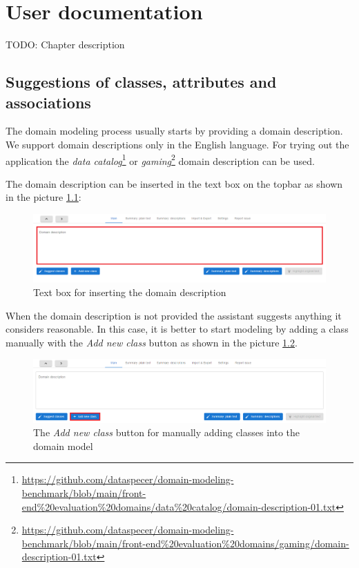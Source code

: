 \chapter{User documentation}

\noindent{}TODO: Chapter description


\section{Suggestions of classes, attributes and associations}

The domain modeling process usually starts by providing a domain description. We support domain descriptions only in the English language. For trying out the application the \textit{data catalog}\footnote{\url{https://github.com/dataspecer/domain-modeling-benchmark/blob/main/front-end\%20evaluation\%20domains/data\%20catalog/domain-description-01.txt}} or \textit{gaming}\footnote{\url{https://github.com/dataspecer/domain-modeling-benchmark/blob/main/front-end\%20evaluation\%20domains/gaming/domain-description-01.txt}} domain description can be used.

The domain description can be inserted in the text box on the topbar as shown in the picture \ref{fig:domain-description-text-box}:

\begin{figure}[!h]
    \includegraphics[scale=0.35]{../docs/images/frontend/insert-domain-description.png}
    \caption{\centering Text box for inserting the domain description}
    \label{fig:domain-description-text-box}
\end{figure}

When the domain description is not provided the assistant suggests anything it considers reasonable. In this case, it is better to start modeling by adding a class manually with the \textit{Add new class} button as shown in the picture \ref{fig:add_new_class}.

\begin{figure}[!h]
    \includegraphics[scale=0.36]{../docs/images/frontend/add-new-class-manually.png}
    \caption{\centering The \textit{Add new class} button for manually adding classes into the domain model}
    \label{fig:add_new_class}
\end{figure}

